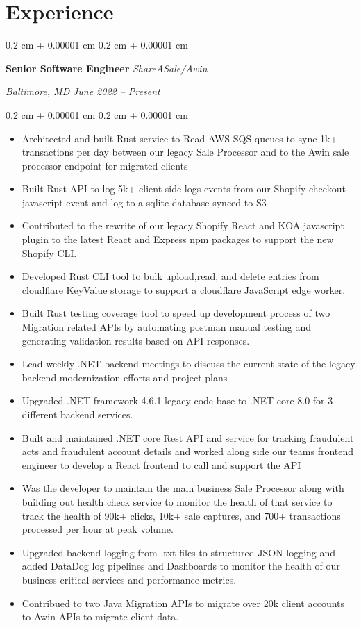 \documentclass[10pt, letterpaper]{article}
\newenvironment{highlights}{
    \begin{itemize}[
        topsep=0.10 cm,
        parsep=0.10 cm,
        partopsep=0pt,
        itemsep=0pt,
        leftmargin=0.4 cm + 10pt
        ]
    }{
\end{itemize}
} %
\newenvironment{onecolentry}{
    \begin{adjustwidth}{
            0.2 cm + 0.00001 cm
        }{
            0.2 cm + 0.00001 cm
        }
    }{
    \end{adjustwidth}
} %
\newenvironment{twocolentry}[2][]{
    \onecolentry
    \def\secondColumn{#2}
    \setcolumnwidth{\fill, 10.5 cm}
    \begin{paracol}{2}
    }{
        \switchcolumn \raggedleft \secondColumn
    \end{paracol}
    \endonecolentry
} %
\begin{document}
\section{Experience}
\begin{twocolentry}{
    \textit{Baltimore, MD}
    \textit{June 2022 – Present}}
    \textbf{Senior Software Engineer}
    \textit{ShareASale/Awin}
\end{twocolentry}
\begin{onecolentry}
    \begin{highlights}
        \item Architected and built Rust service to Read AWS SQS queues to sync 1k+ transactions per day between our legacy Sale Processor and to the Awin sale processor endpoint for migrated clients
        \item Built Rust API to log 5k+ client side logs events from our Shopify checkout javascript event and log to a sqlite database synced to S3
        \item Contributed to the rewrite of our legacy Shopify React and KOA javascript plugin to the latest React and Express npm packages to support the new Shopify CLI.
        \item Developed Rust CLI tool to bulk upload,read, and delete entries from cloudflare KeyValue storage to support a cloudflare JavaScript edge worker.
        \item Built Rust testing coverage tool to speed up development process of two Migration related APIs by automating postman manual testing and generating validation results based on API responses.
        \item Lead weekly .NET backend meetings to discuss the current state of the legacy backend modernization efforts and project plans
        \item Upgraded .NET framework 4.6.1 legacy code base to .NET core 8.0 for 3 different backend services.
        \item Built and maintained .NET core Rest API and service for tracking fraudulent acts and fraudulent account details and worked along side our teams frontend engineer to develop a React frontend to call and support the API
        \item Was the developer to maintain the main business Sale Processor along with building out health check service to monitor the health of that service to track the health of 90k+ clicks, 10k+ sale captures, and 700+ transactions processed per hour at peak volume.
        \item Upgraded backend logging from .txt files to structured JSON logging and added DataDog log pipelines and Dashboards to monitor the health of our business critical services and performance metrics.
        \item Contribued to two Java Migration APIs to migrate over 20k client accounts to Awin APIs to migrate client data.
    \end{highlights}
\end{onecolentry}
\end{document}
